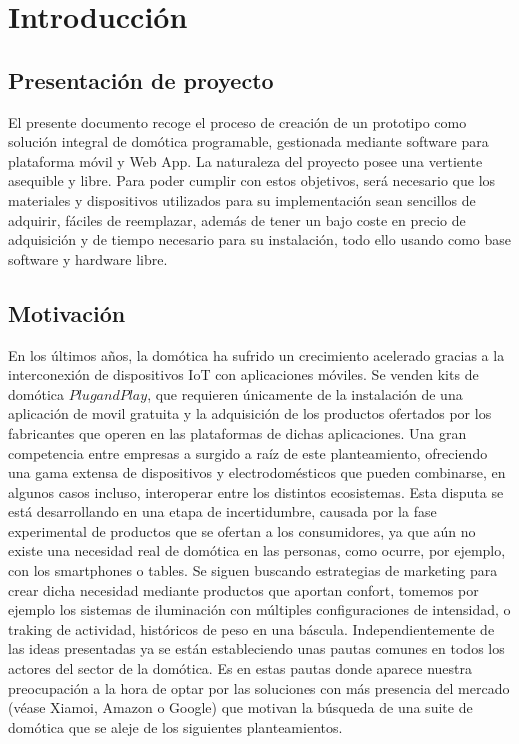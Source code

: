 \cleardoublepage

\chapter{Introducción}

\section{Presentación de proyecto}
\label{ch:Capitulo1}
El presente documento recoge el proceso de creación de un prototipo como solución integral de domótica programable, gestionada mediante software para plataforma móvil y Web App. La naturaleza del proyecto posee una vertiente asequible y libre. Para poder cumplir con estos objetivos, será necesario que los materiales y dispositivos utilizados para su implementación sean sencillos de adquirir, fáciles de reemplazar, además de tener un bajo coste en precio de adquisición y de tiempo necesario para su instalación, todo ello usando como base software y hardware libre.

\section{Motivación}
\label{ch:Capitulo1.1}

En los últimos años, la domótica ha sufrido un crecimiento acelerado gracias a la interconexión de dispositivos IoT con aplicaciones móviles. Se venden kits de domótica $Plug and Play$, que requieren únicamente de la instalación de una aplicación de movil gratuita y la adquisición de los productos ofertados por los fabricantes que operen en las plataformas de dichas aplicaciones. Una gran competencia entre empresas a surgido a raíz de este planteamiento, ofreciendo una gama extensa de dispositivos y electrodomésticos que pueden combinarse, en algunos casos incluso, interoperar entre los distintos ecosistemas. Esta disputa se está desarrollando en una etapa de incertidumbre, causada por la fase experimental de productos que se ofertan a los consumidores, ya que aún no existe una necesidad real de domótica en las personas, como ocurre, por ejemplo, con los smartphones o tables. Se siguen buscando estrategias de marketing para crear dicha necesidad mediante productos que aportan confort, tomemos por ejemplo los sistemas de iluminación con múltiples configuraciones de intensidad, o traking de actividad, históricos de peso en una báscula. Independientemente de las ideas presentadas ya se están estableciendo unas pautas comunes en todos los actores del sector de la domótica. Es en estas pautas donde aparece nuestra preocupación a la hora de optar por las soluciones con más presencia del mercado (véase Xiamoi, Amazon o Google) que motivan la búsqueda de una suite de domótica que se aleje de los siguientes planteamientos.

